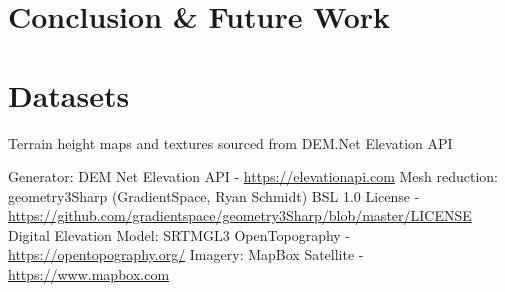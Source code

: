 \documentclass[sigconf,authordraft]{acmart}
\begin{document}
\section{Conclusion \& Future Work}

\begin{acks}

\end{acks}

\section*{Datasets}

Terrain height maps and textures sourced from DEM.Net Elevation API

Generator: DEM Net Elevation API -
\url{https://elevationapi.com}
Mesh reduction: geometry3Sharp (GradientSpace, Ryan Schmidt) BSL 1.0 License -
\url{https://github.com/gradientspace/geometry3Sharp/blob/master/LICENSE}
Digital Elevation Model: SRTM\textunderscore{}GL3 OpenTopography -
\url{https://opentopography.org/}
Imagery: MapBox Satellite -
\url{https://www.mapbox.com}




\appendix
\end{document}
